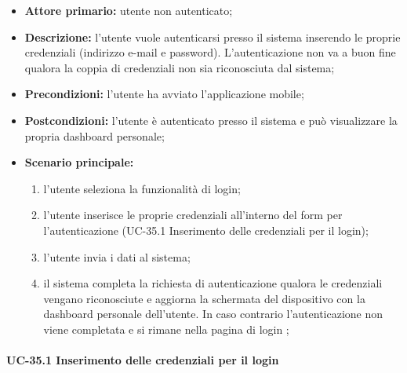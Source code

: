 	\begin{itemize}
		\item \textbf{Attore primario:} utente non autenticato;

		\item \textbf{Descrizione:} l'utente vuole autenticarsi presso il sistema inserendo le proprie credenziali (indirizzo e-mail e password). L'autenticazione non va a buon fine qualora la coppia di credenziali non sia riconosciuta dal sistema;

		\item \textbf{Precondizioni:} l'utente ha avviato l'applicazione mobile;

		\item \textbf{Postcondizioni:} l'utente è autenticato presso il sistema e può visualizzare la propria dashboard personale;

		\item \textbf{Scenario principale:}
	  		\begin{enumerate}
		  		\item l'utente seleziona la funzionalità di login;
		  		\item l'utente inserisce le proprie credenziali all'interno del form per l'autenticazione (UC-35.1 Inserimento delle credenziali per il login);
		  		\item l'utente invia i dati al sistema;
		  		\item il sistema completa la richiesta di autenticazione qualora le credenziali vengano riconosciute e aggiorna la schermata del dispositivo con la dashboard personale dell'utente. In caso contrario l'autenticazione non viene completata e si rimane nella pagina di login ;
	  		\end{enumerate}
	\end{itemize}

\paragraph{UC-35.1 Inserimento delle credenziali per il login}


